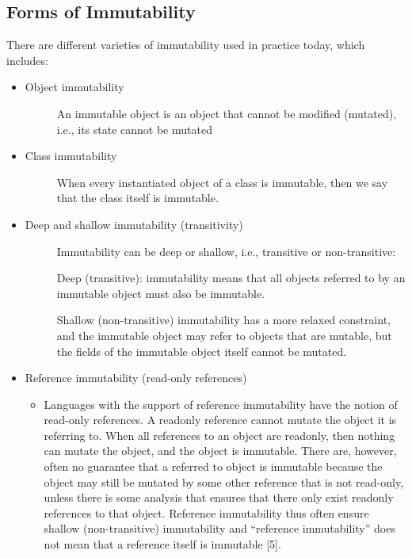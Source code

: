 \documentclass[12pt,twoside]{article}
\begin{document}
\subsection{Forms of Immutability}
There are different varieties of immutability used in practice today, which includes:
\begin{itemize}
    \item Object immutability
    \begin{description}
        \item[] An immutable object is an object that cannot be modified (mutated), i.e., its state cannot be mutated
    \end{description}
    \item Class immutability 
    \begin{description}
        \item[] When every instantiated object of a class is immutable, then we say that the class itself is immutable.
    \end{description}
    \item Deep and shallow immutability (transitivity)\begin{description}
        \item[] Immutability can be deep or shallow, i.e., transitive or non-transitive:
        \item[]Deep (transitive): immutability means that all objects referred to by an immutable object must also be immutable.
        \item[]Shallow (non-transitive) immutability has a more relaxed constraint, and the immutable object may refer to objects that are mutable, but the fields of the immutable object itself cannot be mutated.
    \end{description}    
    \item Reference immutability (read-only references)
     \begin{itemize}
    \item[] Languages with the support of reference immutability have the notion of read-only references. A readonly reference cannot mutate the object it is referring to. When all references to an object are readonly, then nothing can mutate the object, and the object is immutable. There are, however, often no guarantee that a referred to object is immutable because the object may still be mutated by some other reference that is not read-only, unless there is some analysis that ensures that there only exist readonly references to that object. Reference immutability thus often ensure shallow (non-transitive) immutability and “reference immutability” does not mean that a reference itself is immutable [5].
\end{itemize}



\end{itemize}
\end{document}
